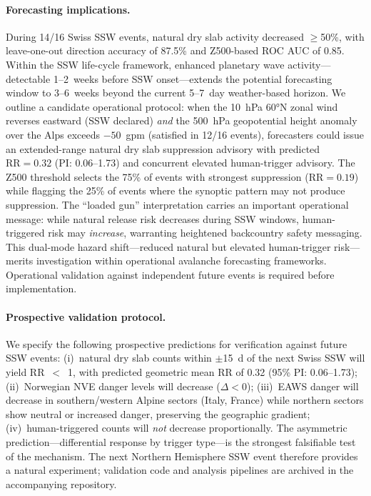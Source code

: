 \documentclass[11pt,letterpaper]{article}
\begin{document}
\paragraph{Forecasting implications.} During 14/16 Swiss SSW events, natural dry slab activity decreased $\geq$50\%, with leave-one-out direction accuracy of 87.5\% and Z500-based ROC AUC of 0.85. Within the SSW life-cycle framework, enhanced planetary wave activity---detectable 1--2~weeks before SSW onset\cite{Sigmond2013}---extends the potential forecasting window to 3--6~weeks beyond the current 5--7~day weather-based horizon. We outline a candidate operational protocol: when the 10~hPa 60°N zonal wind reverses eastward (SSW declared) \emph{and} the 500~hPa geopotential height anomaly over the Alps exceeds $-50$~gpm (satisfied in 12/16 events), forecasters could issue an extended-range natural dry slab suppression advisory with predicted $\mathrm{RR} = 0.32$ (PI: 0.06--1.73) and concurrent elevated human-trigger advisory. The Z500 threshold selects the 75\% of events with strongest suppression ($\mathrm{RR} = 0.19$) while flagging the 25\% of events where the synoptic pattern may not produce suppression. The ``loaded gun'' interpretation carries an important operational message: while natural release risk decreases during SSW windows, human-triggered risk may \emph{increase}, warranting heightened backcountry safety messaging. This dual-mode hazard shift---reduced natural but elevated human-trigger risk---merits investigation within operational avalanche forecasting frameworks. Operational validation against independent future events is required before implementation.

\paragraph{Prospective validation protocol.} We specify the following prospective predictions for verification against future SSW events: (i)~natural dry slab counts within $\pm$15~d of the next Swiss SSW will yield RR~$<$~1, with predicted geometric mean RR of 0.32 (95\% PI: 0.06--1.73); (ii)~Norwegian NVE danger levels will decrease ($\Delta < 0$); (iii)~EAWS danger will decrease in southern/western Alpine sectors (Italy, France) while northern sectors show neutral or increased danger, preserving the geographic gradient; (iv)~human-triggered counts will \emph{not} decrease proportionally. The asymmetric prediction---differential response by trigger type---is the strongest falsifiable test of the mechanism. The next Northern Hemisphere SSW event therefore provides a natural experiment; validation code and analysis pipelines are archived in the accompanying repository.
\end{document}
